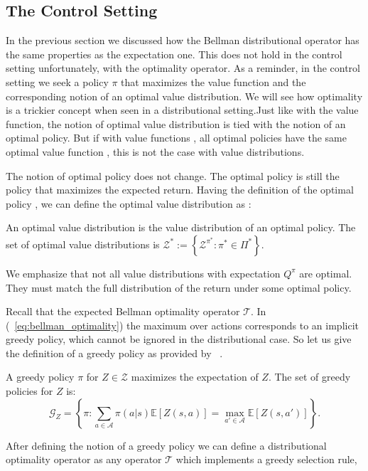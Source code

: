 \subsection{The Control Setting}
In the previous section we discussed how the Bellman distributional operator has the same properties as the expectation one. This does not hold in the control setting unfortunately, with the optimality operator. As a reminder, in the control setting we seek a policy $\pi$ that maximizes the value function and the corresponding notion of an optimal value distribution. We will see how optimality is a trickier concept when seen in a distributional setting.Just like with the value function, the notion of optimal value distribution is tied with the notion of an optimal policy. But if with value functions , all optimal policies have the same optimal value function , this is not the case with value distributions. \par
The notion of optimal policy does not change. The optimal policy is still the policy that maximizes the expected return. Having the definition of the optimal policy , we can define the optimal value distribution as :
\begin{definition}
	An optimal value distribution is the value distribution of an optimal policy. The set of optimal value distributions is  $\mathcal{Z^*} := \left\lbrace \mathcal{Z^{\pi^*}} : \pi^* \in \Pi^* \right\rbrace$.
\end{definition}
We emphasize that not all value distributions with expectation $Q^\pi$ are optimal. They must match the full distribution  of the return under some optimal policy.\par
Recall that the expected Bellman optimality operator $\mathcal{T}$. In (~\ref{eq:bellman_optimality}) the maximum over actions corresponds to an implicit greedy policy, which cannot be ignored in the distributional case. So let us give the definition of a greedy policy as provided by ~\cite{DBLP:journals/corr/BellemareDM17}.
\begin{definition}
	A greedy policy $\pi$ for $Z \in \mathcal{Z}$ maximizes the expectation of $Z$. The set of greedy policies for $Z$ is:
	\begin{equation*}
	\mathcal{G}_{Z} = \left\lbrace \pi : \sum_{a \in \mathcal{A}} \pi(a|s) \mathbb{E}\left[Z(s,a)\right] =\max_{a' \in \mathcal{A}} \mathbb{E} \left[Z(s,a')\right] \right\rbrace.
	\end{equation*}
\end{definition}
After defining the notion of a greedy policy we can define a distributional optimality operator as any operator $\mathcal{T}$ which implements a greedy selection rule, \ie
